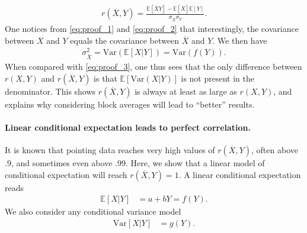 \documentclass[acmlarge, manuscript,review]{acmart}
\begin{document}
\begin{align}
	r(\overline{X},Y) = \frac{\mathbb{E}[\overline{X}Y] - \mathbb{E}[\overline{X}]\mathbb{E}[Y]}{\sigma_{\overline{X}} \sigma_Y}.
\end{align}
One notices from \autoref{eq:proof_1} and \autoref{eq:proof_2} that interestingly, the covariance between $X$ and $Y$ equals the covariance between $\overline{X}$ and $Y$. We then have
\begin{align}
	\sigma_{\overline{X}}^2 = \text{Var}(\mathbb{E}[X|Y]) = \text{Var}(f(Y)).
\end{align}
When compared with \autoref{eq:proof_3}, one thus sees that the only difference between $r(X,Y)$ and $r(\overline{X},Y)$ is that $\mathbb{E}[\text{Var}(X|Y)]$ is not present in the denominator. This shows $r(\overline{X},Y)$ is always at least as large as $r(X,Y)$, and explains why considering block averages will lead to ``better'' results.

\paragraph{Linear conditional expectation leads to perfect correlation.}
It is known that pointing data reaches very high values of $r(\overline{X},Y)$, often above $.9$, and sometimes even above $.99$. Here, we show that a linear model of conditional expectation will reach $r(\overline{X},Y) = 1$.
A linear conditional expectation reads
\begin{align}
	\mathbb{E}[X|Y] & = a + b Y  = f(Y).
\end{align}
We also consider any conditional variance model
\begin{align}
	\text{Var}[X|Y] & = g(Y).
\end{align}
\end{document}
